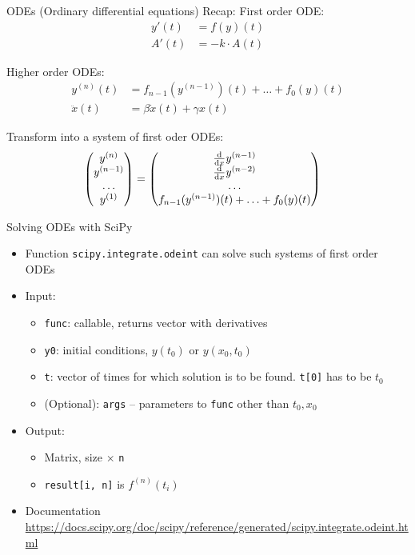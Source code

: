 \begin{frame}{ODEs (Ordinary differential equations)}
%
Recap: First order ODE:
\begin{align*}
	y'(t) &= f(y)(t)\\
	A'(t) &= -k \cdot A(t)
\end{align*}

Higher order ODEs:
\begin{align*}
	y^{(n)}(t) &= f_{n-1}(y^{(n-1)})(t) + \ldots + f_0(y)(t)\\
	\ddot{x}(t) &= \beta \dot{x}(t) + \gamma x(t)
\end{align*}

Transform into a system of first oder ODEs:
\begin{align*}
	\begin{pmatrix}
		y^{(n)} \\
		y^{(n-1)} \\
		\hdots \\
		y^{(1)}
	\end{pmatrix}
&=
	\begin{pmatrix}
		\dv{x} y^{(n-1)} \\
		\dv{x} y^{(n-2)} \\
		\hdots \\
		f_{n-1}(y^{(n-1)})(t) + \ldots + f_0(y)(t)
	\end{pmatrix}
\end{align*}
%
\end{frame}


\begin{frame}[fragile]{Solving ODEs with SciPy}
%
\begin{itemize}
\item Function \texttt{scipy.integrate.odeint} can solve such systems of first order ODEs
\item Input:
	\begin{itemize}
	\item \texttt{func}: callable, returns vector with derivatives
	\item \texttt{y0}: initial conditions, \ie $y(t_0)$ or $y(x_0, t_0)$
	\item \texttt{t}: vector of times for which solution is to be found. \texttt{t[0]} has to be $t_0$
	\item (Optional): \texttt{args} -- parameters to \texttt{func} other than $t_0, x_0$
	\end{itemize}
\item Output:
	\begin{itemize}
	\item Matrix, size  $\times$ \texttt{n}
	\item \texttt{result[i, n]} is $f^{(n)}(t_i)$
	\end{itemize}
\item Documentation\\
	{\scriptsize \url{https://docs.scipy.org/doc/scipy/reference/generated/scipy.integrate.odeint.html}}
\end{itemize}
%
\end{frame}


